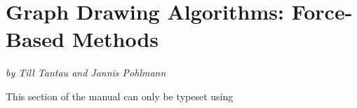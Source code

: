 %
%
%


\section{Graph Drawing Algorithms: Force-Based Methods}
\label{section-library-graphdrawing-force-based}

{\emph{by Till Tantau and Jannis Pohlmann}}

\ifluatex
\else
    This section of the manual can only be typeset using 
    \expandafter\endinput
\fi


\includeluadocumentationof{pgf.gd.force.library}

\includeluadocumentationof{pgf.gd.force.ControlDeclare}
\includeluadocumentationof{pgf.gd.force.ControlStart}
\includeluadocumentationof{pgf.gd.force.ControlIteration}
\includeluadocumentationof{pgf.gd.force.ControlSprings}
\includeluadocumentationof{pgf.gd.force.ControlElectric}
\includeluadocumentationof{pgf.gd.force.ControlCoarsening}

\includeluadocumentationof{pgf.gd.force.SpringLayouts}
\includeluadocumentationof{pgf.gd.force.SpringHu2006}

\includeluadocumentationof{pgf.gd.force.SpringElectricalLayouts}
\includeluadocumentationof{pgf.gd.force.SpringElectricalHu2006}
\includeluadocumentationof{pgf.gd.force.SpringElectricalWalshaw2000}



